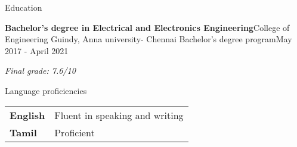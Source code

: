 \documentclass{resume} %
\makeatletter
\newcommand{\italicitem}[1]{\item{\textit{#1}}}
\newcommand{\entry}[2]{#1 & #2 \tabularnewline} %
\newcommand{\tableEnv}[2]{%
  \begin{rSection}{#1} %
    \begin{adjustwidth}{0.0in}{0.1in} %
      \begin{tabularx}{\linewidth}{@{} >{\bfseries}l @{\hspace{6ex}} X @{}}
        #2 %
      \end{tabularx}
    \end{adjustwidth}
  \end{rSection}
}
\makeatother
\begin{document}
\begin{rSection}{Education}

    
    \begin{rSubsectionNoBullet}{\bf Bachelor's degree in Electrical and Electronics Engineering}{College of Engineering Guindy, Anna university- Chennai }{Bachelor's degree program}{May 2017 - April 2021}
        \italicitem{Final grade: 7.6/10}
    \end{rSubsectionNoBullet}

\end{rSection}


\tableEnv{Language proficiencies}{
    \entry{English}{Fluent in speaking and writing}
    \entry{Tamil}{Proficient}
}



\end{document}
